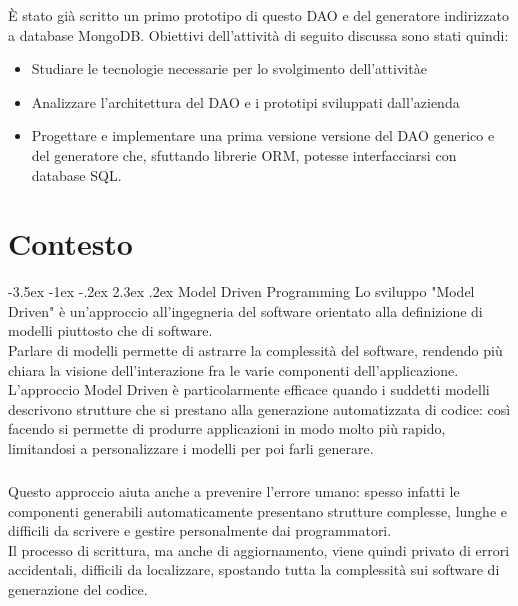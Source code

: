 \documentclass[a4paper, 12pt]{report}
\begin{document}
    È stato già scritto un primo prototipo di questo DAO e del generatore indirizzato a database MongoDB.
    Obiettivi dell'attività di seguito discussa sono stati quindi:
    \begin{itemize}
      \item Studiare le tecnologie necessarie per lo svolgimento dell'attivitàe
      \item Analizzare l'architettura del DAO e i prototipi sviluppati dall'azienda
      \item Progettare e implementare una prima versione versione del DAO generico e del generatore che, sfuttando librerie ORM, potesse interfacciarsi con database SQL.
    \end{itemize}
    \renewcommand\section{\@startsection{section}{1}{\z@}%
    {-3.5ex \@plus -1ex \@minus -.2ex}%
    {2.3ex \@plus.2ex}%
    {\normalfont\large\bfseries}}
  \newpage
  \tableofcontents
  \newpage

  \chapter{Contesto}
    \section{Model Driven Programming}
      Lo sviluppo "Model Driven" è un'approccio all'ingegneria del software orientato alla definizione di modelli piuttosto che di software.\\
      Parlare di modelli permette di astrarre la complessità del software, rendendo più chiara la visione dell'interazione fra le varie componenti dell'applicazione.\\
      L'approccio Model Driven è particolarmente efficace quando i suddetti modelli descrivono strutture che si prestano alla generazione automatizzata di codice: così facendo si permette di produrre applicazioni in modo molto più rapido, limitandosi a personalizzare
      i modelli per poi farli generare.
      \paragraph*{}Questo approccio aiuta anche a prevenire l'errore umano: spesso infatti le componenti generabili automaticamente presentano strutture complesse, lunghe e difficili da scrivere e gestire personalmente dai programmatori.\\
      Il processo di scrittura, ma anche di aggiornamento, viene quindi privato di errori accidentali, difficili da localizzare, spostando tutta la complessità sui software di generazione del codice.\\
\end{document}
